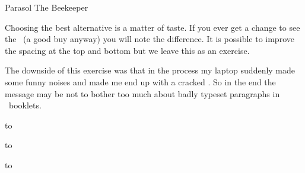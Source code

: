\startbuffer
\definecolor[BeeColor][BeeColorC]%
\startcombination
  {}
  {Parasol}
  {}
  {The Beekeeper}
\stopcombination
\stopbuffer

\typebuffer

Choosing the best alternative is a matter of taste. If you ever get a change to
see the \CD\ (a good buy anyway) you will note the difference. It is possible to
improve the spacing at the top and bottom but we leave this as an exercise.

  {\getbuffer}

The downside of this exercise was that in the process my laptop suddenly made
some funny noises and made me end up with a cracked \CD. So in the end the
message may be not to bother too much about badly typeset paragraphs in \CD\
booklets.

\vbox to \vsize \bgroup

  \vfil

  \hbox to \hsize \bgroup \hss
  \hss \egroup

  \vfil \vfil

  \hbox to \hsize \bgroup \hss
  \hss \egroup

  \vfil

\egroup

\stopdocument

